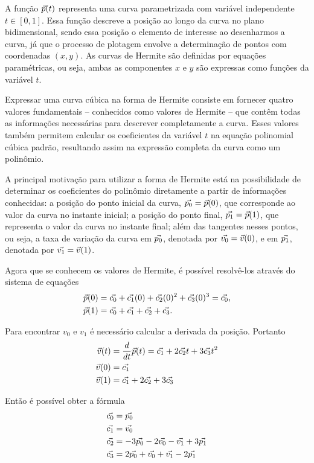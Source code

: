 A função ${\vec{p}}(t)$ representa uma curva parametrizada com variável independente \( t \in [0,1] \). Essa função descreve a posição ao longo da curva no plano bidimensional, sendo essa posição o elemento de interesse ao desenharmos a curva, já que o processo de plotagem envolve a determinação de pontos com coordenadas $(x, y)$. As curvas de Hermite são definidas por equações paramétricas, ou seja, ambas as componentes $x$ e  $y$ são expressas como funções da variável $t$.

Expressar uma curva cúbica na forma de Hermite consiste em fornecer quatro valores fundamentais -- conhecidos como valores de Hermite -- que contêm todas as informações necessárias para descrever completamente a curva. Esses valores também permitem calcular os coeficientes da variável \( t \) na equação polinomial cúbica padrão, resultando assim na expressão completa da curva como um polinômio.

A principal motivação para utilizar a forma de Hermite está na possibilidade de determinar os coeficientes do polinômio diretamente a partir de informações conhecidas: a posição do ponto inicial da curva, \( {\vec{p_0}} = {\vec{p}}(0) \), que corresponde ao valor da curva no instante inicial; a posição do ponto final, \( {\vec{p_1}} = {\vec{p}}(1) \), que representa o valor da curva no instante final; além das tangentes nesses pontos, ou seja, a taxa de variação da curva em \( {\vec{p_0}} \), denotada por \( {\vec{v_0}} = {\vec{v}}(0) \), e em \( {\vec{p_1}} \), denotada por \( {\vec{v_1}} = {\vec{v}}(1) \).


Agora que se conhecem os valores de Hermite, é possível resolvê-los através do sistema de equações
\begin{align}
    {\vec{p}}(0) &= {\vec{c_0}} + {\vec{c_1}}(0) + {\vec{c_2}}(0)^2 + {\vec{c_3}}(0)^3 = {\vec{c_0}}, \\
    {\vec{p}}(1) &= {\vec{c_0}} + {\vec{c_1}} + {\vec{c_2}} + {\vec{c_3}}.
\end{align}
   

Para encontrar $v_0$ e $v_1$ é necessário calcular a derivada da posição. Portanto
\begin{align}
    {\vec{v}}(t) &= \dfrac{d}{dt}{\vec{p}}(t) = {\vec{c_1}} + 2{\vec{c_2}}t + 3{\vec{c_3}}t^2\\
    {\vec{v}}(0) &= {\vec{c_1}}\\
    {\vec{v}}(1) &= {\vec{c_1}} + 2{\vec{c_2}} + 3{\vec{c_3}}
\end{align}

Então é possível obter a fórmula
\begin{align}
    {\vec{c_0}} &= {\vec{p_0}}\\
    {\vec{c_1}} &= {\vec{v_0}}\\
    {\vec{c_2}} &= -3{\vec{p_0}} - 2{\vec{v_0}} - {\vec{v_1}} + 3{\vec{p_1}}\\
    {\vec{c_3}} &= 2{\vec{p_0}} + {\vec{v_0}} + {\vec{v_1}} - 2{\vec{p_1}} 
\end{align}

